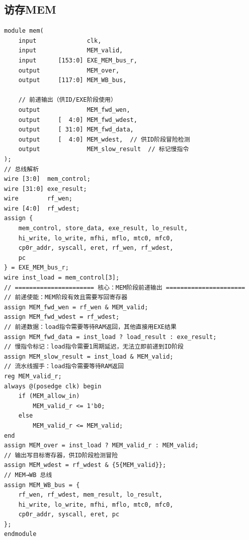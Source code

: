 ﻿\documentclass{article}
\begin{document}
\subsection{访存\textbf{MEM}}
\begin{verbatim}
module mem(
    input              clk,
    input              MEM_valid,
    input      [153:0] EXE_MEM_bus_r,
    output             MEM_over,
    output     [117:0] MEM_WB_bus,

    // 前递输出（供ID/EXE阶段使用）
    output             MEM_fwd_wen,
    output     [  4:0] MEM_fwd_wdest,
    output     [ 31:0] MEM_fwd_data,
    output     [  4:0] MEM_wdest,  // 供ID阶段冒险检测
    output             MEM_slow_result  // 标记慢指令
);
// 总线解析
wire [3:0]  mem_control;
wire [31:0] exe_result;
wire        rf_wen;
wire [4:0]  rf_wdest;
assign {
    mem_control, store_data, exe_result, lo_result,
    hi_write, lo_write, mfhi, mflo, mtc0, mfc0,
    cp0r_addr, syscall, eret, rf_wen, rf_wdest,
    pc
} = EXE_MEM_bus_r;
wire inst_load = mem_control[3];
// ====================== 核心：MEM阶段前递输出 ======================
// 前递使能：MEM阶段有效且需要写回寄存器
assign MEM_fwd_wen = rf_wen & MEM_valid;
assign MEM_fwd_wdest = rf_wdest;
// 前递数据：load指令需要等待RAM返回，其他直接用EXE结果
assign MEM_fwd_data = inst_load ? load_result : exe_result;
// 慢指令标记：load指令需要1周期延迟，无法立即前递到ID阶段
assign MEM_slow_result = inst_load & MEM_valid;
// 流水线握手：load指令需要等待RAM返回
reg MEM_valid_r;
always @(posedge clk) begin
    if (MEM_allow_in)
        MEM_valid_r <= 1'b0;
    else
        MEM_valid_r <= MEM_valid;
end
assign MEM_over = inst_load ? MEM_valid_r : MEM_valid;
// 输出写目标寄存器，供ID阶段检测冒险
assign MEM_wdest = rf_wdest & {5{MEM_valid}};
// MEM→WB 总线
assign MEM_WB_bus = {
    rf_wen, rf_wdest, mem_result, lo_result,
    hi_write, lo_write, mfhi, mflo, mtc0, mfc0,
    cp0r_addr, syscall, eret, pc
};
endmodule
\end{verbatim}
\end{document}
